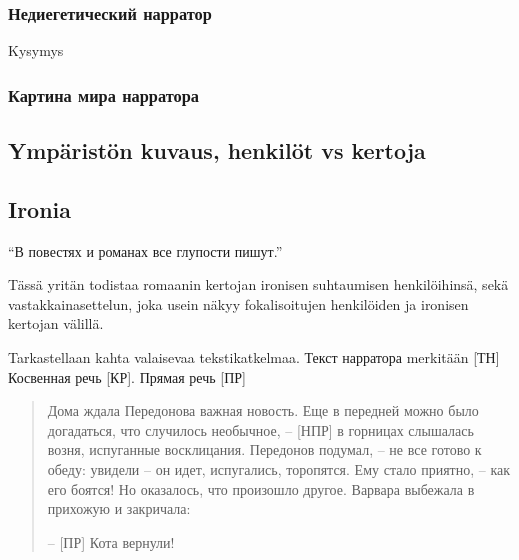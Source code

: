 \documentclass[12pt,a4paper]{article}
\begin{document}
\subsubsection{Недиегетический нарратор}

Kysymys

\subsubsection{Картина мира нарратора}

\subsection{Ympäristön kuvaus, henkilöt vs kertoja}

\subsection{Ironia}

\enquote{В повестях и романах все глупости пишут.} \parencite[54]{sologub2004}



Tässä yritän todistaa romaanin kertojan ironisen suhtaumisen henkilöihinsä, sekä vastakkainasettelun, joka usein näkyy fokalisoitujen henkilöiden ja ironisen kertojan välillä.
% 
% 
% 
%

Tarkastellaan kahta valaisevaa tekstikatkelmaa. Текст нарратора merkitään [ТН] Косвенная речь [КР]. Прямая речь [ПР]

\begin{quote}
Дома ждала Передонова важная новость. Еще в передней можно
было догадаться, что случилось необычное, – [НПР] в горницах слышалась 
возня, испуганные восклицания. Передонов подумал, – не все
готово к обеду: увидели – он идет, испугались, торопятся. Ему стало
приятно, – как его боятся! Но оказалось, что произошло другое. 
Варвара выбежала в прихожую и закричала:

– [ПР] Кота вернули!

\parencite[171.]{sologub2004}

\end{quote}
\end{document}
